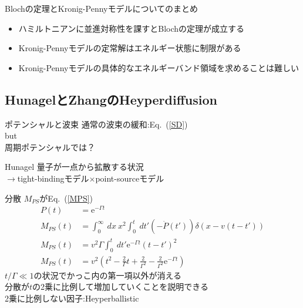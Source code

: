 \documentclass[unicode, 12pt, aspectratio=169]{beamer}
\newcommand{\eref}[1]{Eq.~(\ref{#1})}
\begin{document}
\begin{frame}
    \begin{block}{Blochの定理とKronig-Pennyモデルについてのまとめ}
        \begin{itemize}
            \item ハミルトニアンに並進対称性を課すとBlochの定理が成立する
            \item Kronig-Pennyモデルの定常解はエネルギー状態に制限がある
            \item Kronig-Pennyモデルの具体的なエネルギーバンド領域を求めることは難しい
        \end{itemize}
    \end{block}
\end{frame}

\subsection{HunagelとZhangのHeyperdiffusion}
\frame{\insertsubsection}

\begin{frame}
  \begin{block}{ポテンシャルと波束}
    通常の波束の緩和:\eref{SD}\\
    \alert{but}\\
    周期ポテンシャルでは？
  \end{block}
  \begin{block}{Hunagel}
    量子が一点から拡散する状況\\
    $\rightarrow$tight-bindingモデル$\times$point-sourceモデル
  \end{block}
\end{frame}

  \begin{frame}
    \begin{block}{分散}
    $M_{PS}$が\eref{MPS}
    \begin{align}
    P(t) &= \mathrm{e}^{-\Gamma t}\label{source}\\
    M_{PS}(t)&=\int_{0}^{\infty}\:dx\:x^2\int_{0}^{t}\:dt'(-\dot{P}(t'))\delta(x-v(t-t'))\label{variant}\\
    M_{PS}(t)&=v^2\Gamma\int_{0}^{t}\:dt'\mathrm{e}^{-\Gamma t}(t-t')^2\nonumber\\
    M_{PS}(t)&=v^2\left(t^2-\frac{2}{\Gamma}t+\frac{2}{\Gamma^2}-\frac{2}{\Gamma^2}\mathrm{e}^{-\Gamma t} \right)\label{MPS}
    \end{align}
    $t/\Gamma \ll 1$の状況でかっこ内の第一項以外が消える\\
    分散が$t$の2乗に比例して増加していくことを説明できる\\
    2乗に比例しない因子:Heyperballistic
    \end{block}
  \end{frame}
\end{document}
